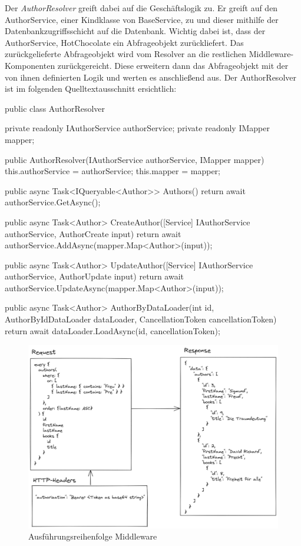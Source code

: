 Der \textit{AuthorResolver} greift dabei auf die Geschäftslogik zu.
Er greift auf den AuthorService, einer Kindklasse von BaseService, zu und dieser mithilfe der Datenbankzugriffsschicht auf die Datenbank.
Wichtig dabei ist, dass der AuthorService, HotChocolate ein Abfrageobjekt zurückliefert.
Das zurückgelieferte Abfrageobjekt wird vom Resolver an die restlichen Middleware-Komponenten zurückgereicht.
Diese erweitern dann das Abfrageobjekt mit der von ihnen definierten Logik und werten es anschließend aus.
Der AuthorResolver ist im folgenden Quelltextausschnitt ersichtlich:
\begin{JsCode}
public class AuthorResolver {
    private readonly IAuthorService authorService;
    private readonly IMapper mapper;

    public AuthorResolver(IAuthorService authorService, IMapper mapper) {
        this.authorService = authorService;
        this.mapper = mapper;
    }

    public async Task<IQueryable<Author>> Authors() {
        return await authorService.GetAsync();
    }

    public async Task<Author> CreateAuthor([Service] IAuthorService authorService, AuthorCreate input) {
        return await authorService.AddAsync(mapper.Map<Author>(input));
    }

    public async Task<Author> UpdateAuthor([Service] IAuthorService authorService, AuthorUpdate input) {
        return await authorService.UpdateAsync(mapper.Map<Author>(input));
    }

    public async Task<Author> AuthorByDataLoader(int id, AuthorByIdDataLoader dataLoader, CancellationToken cancellationToken) {
        return await dataLoader.LoadAsync(id, cancellationToken);
    }
}
\end{JsCode}
\pagebreak
{}
\begin{figure}[H]
    \includegraphics[width=\textwidth]{pics/authors_request.png}
    \caption{Ausführungsreihenfolge Middleware}
\end{figure}

